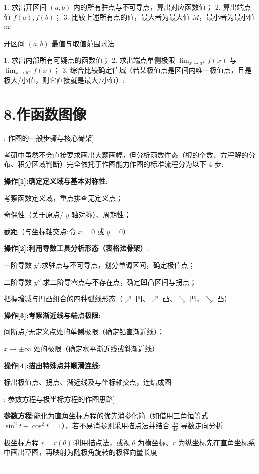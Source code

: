 \documentclass[11pt,a4paper,UTF8]{ctexart}
\begin{document}
1. 求出开区间 $(a, b)$ 内的所有驻点与不可导点，算出对应函数值；
2. 算出端点值 $f(a), f(b)$；
3. 比较上述所有点的值，最大者为最大值 $M$，最小者为最小值 $m$:

\textit{}开区间 $(a, b)$ 最值与取值范围求法\textit{}

1. 求出内部所有可疑点的函数值；
2. 求出端点单侧极限 $\lim_{x \to a^+} f(x)$ 与 $\lim_{x \to b^-} f(x)$；
3. 综合比较确定值域（若某极值点是区间内唯一极值点，且是极大/小值，则它直接就是最大/小值）:


\section{8.作函数图像}

\begin{thmbox}[原理[1]: 作图的一般步骤与核心骨架]

考研中虽然不会直接要求画出大题画幅，但分析函数性态（根的个数、方程解的分布、积分区域判断）完全依托于作图能力作图的标准流程分为以下 4 步:

\textbf{操作[1]:确定定义域与基本对称性}:

考察函数定义域，重点排查无定义点；

奇偶性（关于原点/ $y$ 轴对称）、周期性；

截距（与坐标轴交点:令 $x=0$ 或 $y=0$）

\textbf{操作[2]:利用导数工具分析形态（表格法骨架）}:

一阶导数 $y'$:求驻点与不可导点，划分单调区间，确定极值点；

二阶导数 $y''$:求二阶导零点与不存在点，确定凹凸区间与拐点；

把握增减与凹凸组合的四种弧线形态（$\nearrow$ 凹、$\nearrow$ 凸、$\searrow$ 凹、$\searrow$ 凸）

\textbf{操作[3]:考察渐近线与端点极限}:

间断点/无定义点处的单侧极限（确定铅直渐近线）；

$x \to \pm\infty$ 处的极限（确定水平渐近线或斜渐近线）

\textbf{操作[4]:描出特殊点并顺滑连线}:

标出极值点、拐点、渐近线及与坐标轴交点，连结成图

\end{thmbox}
\begin{thmbox}[原理[2]: 参数方程与极坐标方程的作图思路]

\textbf{参数方程}:能化为直角坐标方程的优先消参化简（如借用三角恒等式 $\sin^2 t + \cos^2 t = 1$），若不易消参则采用描点法并结合 $\frac{\mathrm{d}y}{\mathrm{d}x}$ 导数走向分析

\textit{}极坐标方程 $r = r(\theta)$\textit{}:利用描点法，或视 $\theta$ 为横坐标、$r$ 为纵坐标先在直角坐标系中画出草图，再映射为随极角旋转的极径向量长度

---

\end{thmbox}
\end{document}

